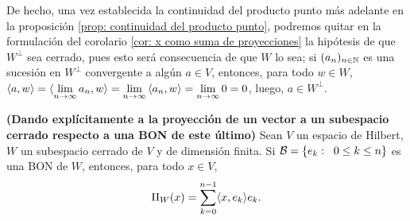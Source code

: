 \begin{nota}
De hecho, una vez establecida la continuidad
del producto punto más adelante en la
proposición \ref{prop: continuidad del producto punto}, podremos
quitar en la formulación del corolario 
\ref{cor: x como suma de proyecciones}
la hipótesis de que $W^{\perp}$ sea cerrado, pues esto
será consecuencia de que $W$ lo sea; si $(a_{n})_{n \in \mathbb{N}}$
es una sucesión en $W^{\perp}$ convergente a algún $a \in V$,
entonces, para todo $w \in W$,
$\langle a, w \rangle = 
\langle \lim\limits_{n \rightarrow \infty}{a_{n}}, w \rangle
= \lim\limits_{n \rightarrow \infty}{\langle a_{n},w \rangle}=
\lim\limits_{n \rightarrow \infty}{0}=0$,
luego, $a \in W^{\perp}$.
\end{nota}


\begin{comment}
\begin{cor} \label{cor: proyeccion en terminos de una BON}
\TODO{Creo que debo quitar este.}
\textbf{(Dando explícitamente a la proyección de un vector
a un subespacio cerrado respecto a una BON de este último)}
Con la notación 
e hipótesis
de la proposición \ref{teo: Kol 6, p.149},
para todo $x \in V$
tenemos que
\[
\Pi_{W}(x) = \suma{k=1}{\infty}{ \langle x, e_{k} \rangle e_{k}},
\]
donde $W := \overline{\{e_{k}| k \in \IN \}}$. 
\end{cor}
\end{comment}

\begin{prop}
\label{cor: proyeccion en terminos de BON}
\textbf{(Dando explícitamente a la proyección de un vector
a un subespacio cerrado respecto a una BON de este último)}
Sean $V$ un espacio de Hilbert, $W$ un subespacio cerrado de $V$
y de dimensión finita. Si 
$\mathcal{B} = \{ e_{k}: \hspace{0.2cm} 0 \leq k \leq n \}$
es una BON de $W$, entonces, para todo $x \in V$,
\[
\Pi_{W}(x) = \sum\limits_{k=0}^{n-1} \langle x, e_{k} \rangle e_{k}.
\]  
\end{prop}

\begin{comment}
\begin{cor} \label{cor: representacion de un vector respecto a una BON}
Si $V$ es un espacio con producto punto 
y $B=(e_{k})_{k \in \Delta}$ es una BON de este
a lo más numerable, entonces, para todo
$x \in V$, $x = \suma{k \in \Delta}{}{\langle x, e_{k} \rangle e_{k}}$
\end{cor}
\noindent
\textbf{Demostración.}
La proyección de un $x \in V$ sobre $V$ es trivialmente $x$
($x$ es el elemento de $V$ más cercano a sí mismo); según el corolario
\ref{cor: proyeccion en terminos de una BON}, esta
proyección es la serie propuesta. \QEDB
\vspace{0.2cm}
\end{comment}



